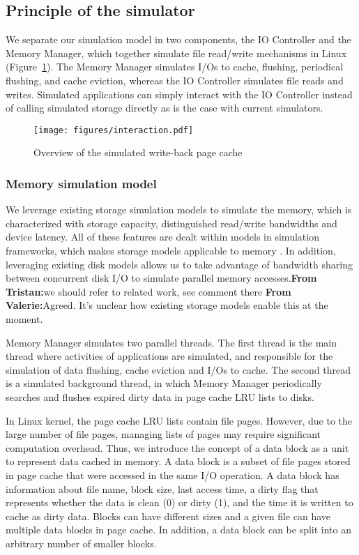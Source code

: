 \documentclass[conference]{IEEEtran}
\newcommand{\tristan}[1]{\color{orange}\textbf{From Tristan:}#1\color{black}}
\newcommand{\valerie}[1]{\color{blue}\textbf{From Valerie:}#1\color{black}}
\begin{document}
		\subsection{Principle of the simulator}
	
            We separate our simulation model in two components, the IO
			Controller and the Memory Manager, which together simulate 
			file read/write mechanisms in Linux (Figure~\ref{fig:interaction}). 
			The Memory Manager simulates I/Os to cache, flushing, periodical flushing, 
			and cache eviction, whereas the IO Controller simulates file reads and writes. 
			Simulated applications can simply interact with the IO Controller instead of 
			calling simulated storage directly as is the case with current simulators.

			\begin{figure}
   				\centering
   				\texttt{[image: figures/interaction.pdf]}
   				\caption{Overview of the simulated write-back page cache}\label{fig:interaction}
			\end{figure}	

			\subsubsection{Memory simulation model}
			
			We leverage existing storage simulation models to simulate the memory,
			which is characterized with storage capacity, distinguished read/write 
			bandwidths and device latency. 
			All of these features are dealt within models in simulation 
			frameworks, which makes storage models applicable to memory \cite{lebre2015}. 
			In addition, leveraging existing disk models allows us 
			to take advantage of bandwidth sharing between concurrent disk I/O to 
			simulate parallel memory accesses.\tristan{we should refer to related work, 
            see comment there} \valerie{Agreed. It's unclear how existing storage models enable this at the moment}.

			Memory Manager simulates two parallel threads. The first thread is the 
			main thread where activities of applications are simulated, and responsible 
			for the simulation of data flushing, cache eviction and I/Os to cache. 
			The second thread is a simulated background thread, in which Memory Manager 
			periodically searches and flushes expired dirty data in page cache LRU lists 
			to disks. 

			In Linux kernel, the page cache LRU lists contain file pages. However, 
			due to the large number of file pages, managing lists of pages may 
			require significant computation overhead. 
			Thus, we introduce the concept of a data block as a unit to represent data 
			cached in memory. A data block is a subset of file pages stored in
            page cache that were accessed in the same I/O operation. 
			A data block has information about file name, block size, last access 
			time, a dirty flag that represents whether the data is clean (0) 
			or dirty (1), and the time it is written to cache as dirty data. 
			Blocks can have different sizes and a given file can have multiple 
			data blocks in page cache. In addition, a data block can be split into an 
			arbitrary number of smaller blocks.
\end{document}
